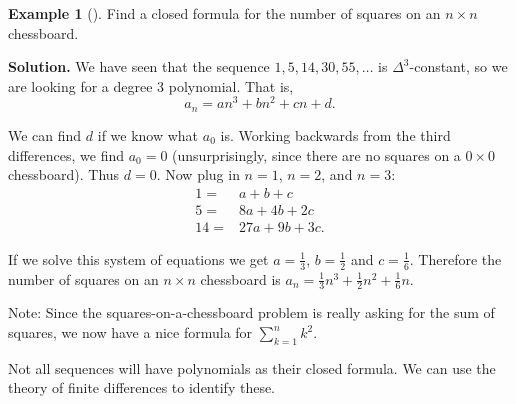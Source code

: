 \documentclass[10pt,]{book}
\theoremstyle{plain}
\theoremstyle{definition}
\theoremstyle{definition}
\newtheorem{example}[theorem]{Example}
\theoremstyle{definition}
\theoremstyle{definition}
\numberwithin{equation}{chapter}
\renewcommand{\d}{\displaystyle}
\newcommand{\amp}{&}
\begin{document}
\begin{example}[]\label{example-16}
\hypertarget{p-245}{}%
Find a closed formula for the number of squares on an \(n \times n\) chessboard.%
\par\smallskip%
\noindent\textbf{Solution.}\hypertarget{solution-27}{}\quad%
\hypertarget{p-246}{}%
We have seen that the sequence \(1, 5, 14, 30, 55, \ldots\) is \(\Delta^3\)-constant, so we are looking for a degree 3 polynomial. That is,%
\begin{equation*}
a_n = an^3 + bn^2 + cn + d.
\end{equation*}
%
\par
\hypertarget{p-247}{}%
We can find \(d\) if we know what \(a_0\) is. Working backwards from the third differences, we find \(a_0 = 0\) (unsurprisingly, since there are no squares on a \(0\times 0\) chessboard). Thus \(d = 0\). Now plug in \(n = 1\), \(n =2\), and \(n =3\):%
\begin{align*}
1 = \amp a + b + c\\
5 = \amp 8a + 4b + 2c\\
14 = \amp 27a + 9b + 3c.
\end{align*}
%
\par
\hypertarget{p-248}{}%
If we solve this system of equations we get \(a = \frac{1}{3}\), \(b = \frac{1}{2}\) and \(c = \frac{1}{6}\). Therefore the number of squares on an \(n \times n\) chessboard is \(a_n = \frac{1}{3}n^3 + \frac{1}{2}n^2 + \frac{1}{6}n\).%
\end{example}
\hypertarget{p-249}{}%
Note: Since the squares-on-a-chessboard problem is really asking for the sum of squares, we now have a nice formula for \(\d\sum_{k=1}^n k^2\).%
\par
\hypertarget{p-250}{}%
Not all sequences will have polynomials as their closed formula. We can use the theory of finite differences to identify these.%
\end{document}
